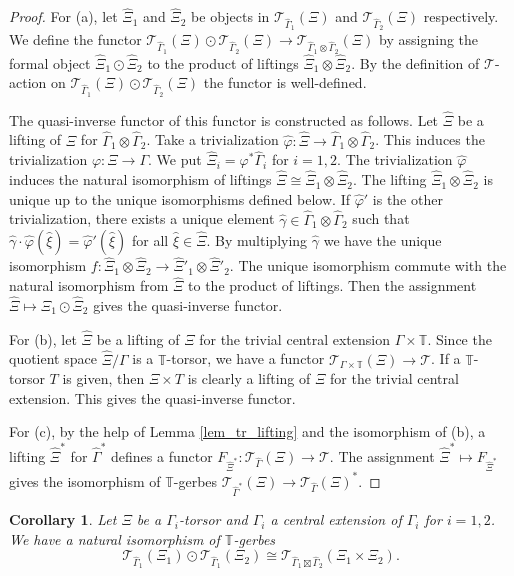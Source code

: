 \documentclass[a4paper,a4paper]{article}
\newtheorem{cor}[thm]{Corollary}
\theoremstyle{definition}
\theoremstyle{remark}
\newcommand{\T}{\mathbb{T}}
\newcommand{\sT}{\mathcal{T}}
\def\h#1{ \widehat{#1} }
\begin{document}
\begin{proof}
For (a), let $\h{\Xi}_1$ and $\h{\Xi}_2$ be objects in $\sT_{\h{\Gamma}_1}(\Xi)$ and $\sT_{\h{\Gamma}_2}(\Xi)$ respectively. We define the functor $\sT_{\h{\Gamma}_1}(\Xi) \odot \sT_{\h{\Gamma}_2}(\Xi) \to \sT_{\h{\Gamma}_1 \otimes \h{\Gamma}_2}(\Xi)$ by assigning the formal object $\h{\Xi}_1 \odot \h{\Xi}_2$ to the product of liftings $\h{\Xi}_1 \otimes \h{\Xi}_2$. By the definition of $\sT$-action on $\sT_{\h{\Gamma}_1}(\Xi) \odot \sT_{\h{\Gamma}_2}(\Xi)$ the functor is well-defined.

The quasi-inverse functor of this functor is constructed as follows. Let $\h{\Xi}$ be a lifting of $\Xi$ for $\h{\Gamma}_1 \otimes \h{\Gamma}_2$. Take a trivialization $\h{\varphi} : \h{\Xi} \to \h{\Gamma}_1 \otimes \h{\Gamma}_2$. This induces the trivialization $\varphi : \Xi \to \Gamma$. We put $\h{\Xi}_i = \varphi^* \h{\Gamma}_i$ for $i = 1, 2$. The trivialization $\h{\varphi}$ induces the natural isomorphism of liftings $\h{\Xi} \cong \h{\Xi}_1 \otimes \h{\Xi}_2$. The lifting $\h{\Xi}_1 \otimes \h{\Xi}_2$ is unique up to the unique isomorphisms defined below. If $\h{\varphi}'$ is the other trivialization, there exists a unique element $\h{\gamma} \in \h{\Gamma}_1 \otimes \h{\Gamma}_2$ such that $\h{\gamma} \cdot \h{\varphi}(\h{\xi}) = \h{\varphi}'(\h{\xi})$ for all $\h{\xi} \in \h{\Xi}$. By multiplying $\h{\gamma}$ we have the unique isomorphism $f : \h{\Xi}_1 \otimes \h{\Xi}_2 \to \h{\Xi}'_1 \otimes \h{\Xi}'_2$. The unique isomorphism commute with the natural isomorphism from $\h{\Xi}$ to the product of liftings. Then the assignment $\h{\Xi} \mapsto \h{\Xi}_1 \odot \h{\Xi}_2$ gives the quasi-inverse functor.

For (b), let $\h{\Xi}$ be a lifting of $\Xi$ for the trivial central extension $\Gamma \times \T$. Since the quotient space $\h{\Xi}/\Gamma$ is a $\T$-torsor, we have a functor $\sT_{\Gamma \times \T}(\Xi) \to \sT$. If a $\T$-torsor $T$ is given, then $\Xi \times T$ is clearly a lifting of $\Xi$ for the trivial central extension. This gives the quasi-inverse functor.

For (c), by the help of Lemma \ref{lem_tr_lifting} and the isomorphism of (b), a lifting $\h{\Xi}^*$ for $\h{\Gamma}^*$ defines a functor $F_{\h{\Xi}^*} : \sT_{\h{\Gamma}}(\Xi) \to \sT$. The assignment $\h{\Xi}^* \mapsto F_{\h{\Xi}^*}$ gives the isomorphism of $\T$-gerbes $\sT_{\h{\Gamma}^*}(\Xi) \to \sT_{\h{\Gamma}}(\Xi)^*$.
\end{proof}

\begin{cor} \label{cor_external_gerbe}
Let $\Xi$ be a $\Gamma_i$-torsor and $\h{\Gamma}_i$ a central extension of $\Gamma_i$ for $i = 1, 2$. We have a natural isomorphism of $\T$-gerbes
$$
\sT_{\h{\Gamma}_1}(\Xi_1) \odot \sT_{\h{\Gamma}_1}(\Xi_2) \cong 
\sT_{\h{\Gamma}_1 \boxtimes \h{\Gamma}_2}(\Xi_1 \times \Xi_2).
$$
\end{cor}
\end{document}
